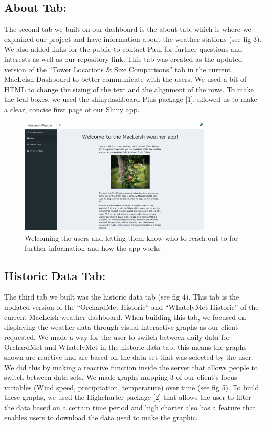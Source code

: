 \documentclass[10pt,letterpaper]{article}
\begin{document}
\subsection{About Tab:}\label{about-tab}

The second tab we built on our dashboard is the about tab, which is
where we explained our project and have information about the weather
stations (see fig 3). We also added links for the public to contact Paul
for further questions and interests as well as our repository link. This
tab was created as the updated version of the ``Tower Locations \& Size
Comparisons'' tab in the current MacLeish Dashboard to better
communicate with the users. We used a bit of HTML to change the sizing
of the text and the alignment of the rows. To make the teal boxes, we
used the shinydashboard Plus package {[}1{]}, allowed us to make a
clear, concise first page of our Shiny app.

\begin{figure}
\includegraphics[width=350px]{welcome} \caption{Welcoming the users and letting them know who to reach out to for further information and how the app works}\label{fig:unnamed-chunk-3}
\end{figure}

\subsection{Historic Data Tab:}\label{historic-data-tab}

The third tab we built was the historic data tab (see fig 4). This tab
is the updated version of the ``OrchardMet Historic'' and ``WhatelyMet
Historic'' of the current MacLeish weather dashboard. When building this
tab, we focused on displaying the weather data through visual
interactive graphs as our client requested. We made a way for the user
to switch between daily data for OrchardMet and WhatelyMet in the
historic data tab, this means the graphs shown are reactive and are
based on the data set that was selected by the user. We did this by
making a reactive function inside the server that allows people to
switch between data sets. We made graphs mapping 3 of our client's focus
variables (Wind speed, precipitation, temperature) over time (see fig
5). To build these graphs, we used the Highcharter package {[}2{]} that
allows the user to filter the data based on a certain time period and
high charter also has a feature that enables users to download the data
used to make the graphic.
\end{document}
